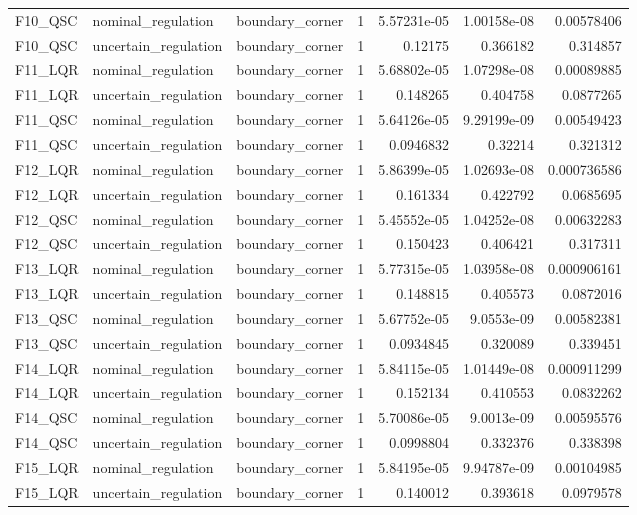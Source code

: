 \begin{tabular}{llllrrr}
F10\_QSC & nominal\_regulation & boundary\_corner & 1 & 5.57231e-05 & 1.00158e-08 & 0.00578406 \\
F10\_QSC & uncertain\_regulation & boundary\_corner & 1 & 0.12175 & 0.366182 & 0.314857 \\
F11\_LQR & nominal\_regulation & boundary\_corner & 1 & 5.68802e-05 & 1.07298e-08 & 0.00089885 \\
F11\_LQR & uncertain\_regulation & boundary\_corner & 1 & 0.148265 & 0.404758 & 0.0877265 \\
F11\_QSC & nominal\_regulation & boundary\_corner & 1 & 5.64126e-05 & 9.29199e-09 & 0.00549423 \\
F11\_QSC & uncertain\_regulation & boundary\_corner & 1 & 0.0946832 & 0.32214 & 0.321312 \\
F12\_LQR & nominal\_regulation & boundary\_corner & 1 & 5.86399e-05 & 1.02693e-08 & 0.000736586 \\
F12\_LQR & uncertain\_regulation & boundary\_corner & 1 & 0.161334 & 0.422792 & 0.0685695 \\
F12\_QSC & nominal\_regulation & boundary\_corner & 1 & 5.45552e-05 & 1.04252e-08 & 0.00632283 \\
F12\_QSC & uncertain\_regulation & boundary\_corner & 1 & 0.150423 & 0.406421 & 0.317311 \\
F13\_LQR & nominal\_regulation & boundary\_corner & 1 & 5.77315e-05 & 1.03958e-08 & 0.000906161 \\
F13\_LQR & uncertain\_regulation & boundary\_corner & 1 & 0.148815 & 0.405573 & 0.0872016 \\
F13\_QSC & nominal\_regulation & boundary\_corner & 1 & 5.67752e-05 & 9.0553e-09 & 0.00582381 \\
F13\_QSC & uncertain\_regulation & boundary\_corner & 1 & 0.0934845 & 0.320089 & 0.339451 \\
F14\_LQR & nominal\_regulation & boundary\_corner & 1 & 5.84115e-05 & 1.01449e-08 & 0.000911299 \\
F14\_LQR & uncertain\_regulation & boundary\_corner & 1 & 0.152134 & 0.410553 & 0.0832262 \\
F14\_QSC & nominal\_regulation & boundary\_corner & 1 & 5.70086e-05 & 9.0013e-09 & 0.00595576 \\
F14\_QSC & uncertain\_regulation & boundary\_corner & 1 & 0.0998804 & 0.332376 & 0.338398 \\
F15\_LQR & nominal\_regulation & boundary\_corner & 1 & 5.84195e-05 & 9.94787e-09 & 0.00104985 \\
F15\_LQR & uncertain\_regulation & boundary\_corner & 1 & 0.140012 & 0.393618 & 0.0979578 \\

\end{tabular}
